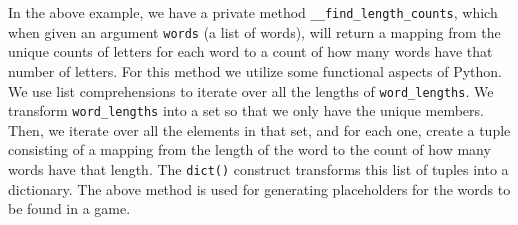 In the above example, we have a private method \texttt{\_\_find\_length\_counts}, which when given an argument \texttt{words} (a list of words), will return a mapping from the unique counts of letters for each word to a count of how many words have that number of letters. For this method we utilize some functional aspects of Python. We use list comprehensions to iterate over all the lengths of \texttt{word\_lengths}. We transform \texttt{word\_lengths} into a set so that we only have the unique members. Then, we iterate over all the elements in that set, and for each one, create a tuple consisting of a mapping from the length of the word to the count of how many words have that length. The \texttt{dict()} construct transforms this list of tuples into a dictionary.
The above method is used for generating placeholders for the words to be found in a game.

